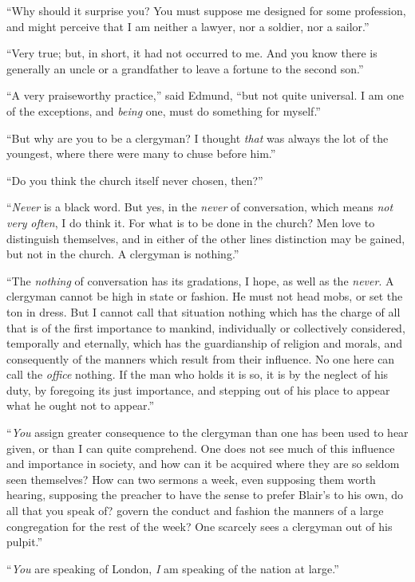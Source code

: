 \documentclass{article}
\begin{document}
``Why should it surprise you?  You must suppose me designed
for some profession, and might perceive that I am neither
a lawyer, nor a soldier, nor a sailor.''

``Very true; but, in short, it had not occurred to me.
And you know there is generally an uncle or a grandfather
to leave a fortune to the second son.''

``A very praiseworthy practice,'' said Edmund,
``but not quite universal.  I am one of the exceptions,
and \emph{being} one, must do something for myself.''

``But why are you to be a clergyman?  I thought \emph{that}
was always the lot of the youngest, where there were
many to chuse before him.''

``Do you think the church itself never chosen, then?''

``\emph{Never} is a black word.  But yes, in the \emph{never}
of conversation, which means \emph{not} \emph{very} \emph{often},
I do think it.  For what is to be done in the church?
Men love to distinguish themselves, and in either of the other
lines distinction may be gained, but not in the church.
A clergyman is nothing.''

``The \emph{nothing} of conversation has its gradations, I hope,
as well as the \emph{never}.  A clergyman cannot be high in
state or fashion.  He must not head mobs, or set the ton
in dress.  But I cannot call that situation nothing which
has the charge of all that is of the first importance
to mankind, individually or collectively considered,
temporally and eternally, which has the guardianship
of religion and morals, and consequently of the manners
which result from their influence.  No one here can call
the \emph{office} nothing.  If the man who holds it is so,
it is by the neglect of his duty, by foregoing its
just importance, and stepping out of his place to appear
what he ought not to appear.''

``\emph{You} assign greater consequence to the clergyman than one
has been used to hear given, or than I can quite comprehend.
One does not see much of this influence and importance
in society, and how can it be acquired where they are
so seldom seen themselves?  How can two sermons a week,
even supposing them worth hearing, supposing the preacher
to have the sense to prefer Blair's to his own, do all
that you speak of? govern the conduct and fashion the
manners of a large congregation for the rest of the week?
One scarcely sees a clergyman out of his pulpit.''

``\emph{You} are speaking of London, \emph{I} am speaking of the
nation at large.''
\end{document}
